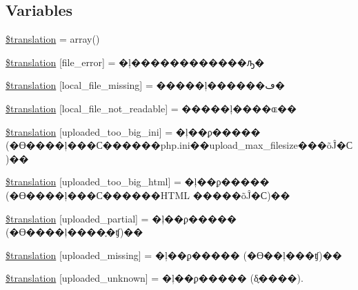 \subsection*{Variables}
\begin{DoxyCompactItemize}
\item 
\hyperlink{class_8upload_8zh___c_n_8gb-2312_8php_a1f198d410fecc3871ebdd468d343a5e3}{\$translation} = array()
\item 
\hyperlink{class_8upload_8zh___c_n_8gb-2312_8php_ac7498e49b9771b04698029aa61c70821}{\$translation} \mbox{[}\textquotesingle{}file\+\_\+error\textquotesingle{}\mbox{]} = \textquotesingle{}�ļ������������ԡ�\textquotesingle{}
\item 
\hyperlink{class_8upload_8zh___c_n_8gb-2312_8php_a6ec3d3a47ab70d77e7aa593e82ead10e}{\$translation} \mbox{[}\textquotesingle{}local\+\_\+file\+\_\+missing\textquotesingle{}\mbox{]} = \textquotesingle{}�����ļ������ڡ�\textquotesingle{}
\item 
\hyperlink{class_8upload_8zh___c_n_8gb-2312_8php_a60104befef9b241f3a7a6a755618a4b3}{\$translation} \mbox{[}\textquotesingle{}local\+\_\+file\+\_\+not\+\_\+readable\textquotesingle{}\mbox{]} = \textquotesingle{}�����ļ����ɶ��\textquotesingle{}
\item 
\hyperlink{class_8upload_8zh___c_n_8gb-2312_8php_a6a08dcd0d3651fdd098568f6b2f0a42c}{\$translation} \mbox{[}\textquotesingle{}uploaded\+\_\+too\+\_\+big\+\_\+ini\textquotesingle{}\mbox{]} = \textquotesingle{}�ļ��ϼ����� (�ϴ����ļ���С������php.\+ini��upload\+\_\+max\+\_\+filesize���õĴ�С)��\textquotesingle{}
\item 
\hyperlink{class_8upload_8zh___c_n_8gb-2312_8php_a623d5b8b92169f57d7e43458aa911cbb}{\$translation} \mbox{[}\textquotesingle{}uploaded\+\_\+too\+\_\+big\+\_\+html\textquotesingle{}\mbox{]} = \textquotesingle{}�ļ��ϼ����� (�ϴ����ļ���С������\+H\+T\+M\+L �����õĴ�С)��\textquotesingle{}
\item 
\hyperlink{class_8upload_8zh___c_n_8gb-2312_8php_a967c17da21b0a2d3bd65cca3a9ca0ea8}{\$translation} \mbox{[}\textquotesingle{}uploaded\+\_\+partial\textquotesingle{}\mbox{]} = \textquotesingle{}�ļ��ϼ����� (�ϴ����ļ����ֶ�ʧ)��\textquotesingle{}
\item 
\hyperlink{class_8upload_8zh___c_n_8gb-2312_8php_a0cce433260be65f1f35853a6b4b8952b}{\$translation} \mbox{[}\textquotesingle{}uploaded\+\_\+missing\textquotesingle{}\mbox{]} = \textquotesingle{}�ļ��ϼ����� (�ϴ��ļ���ʧ)��\textquotesingle{}
\item 
\hyperlink{class_8upload_8zh___c_n_8gb-2312_8php_a4a9168e922b827e6a28b5db1c00774ca}{\$translation} \mbox{[}\textquotesingle{}uploaded\+\_\+unknown\textquotesingle{}\mbox{]} = \textquotesingle{}�ļ��ϼ����� (δ֪����).\textquotesingle{}

\end{DoxyCompactItemize}
